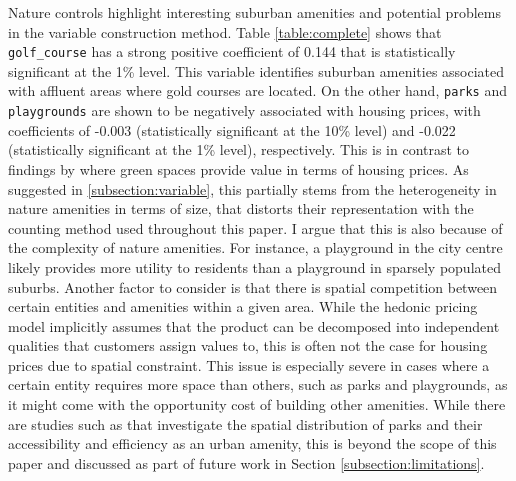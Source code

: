 \documentclass{article}
\begin{document}
Nature controls highlight interesting suburban amenities and potential problems in the variable construction method. Table \ref{table:complete} shows that \texttt{golf\_course} has a strong positive coefficient of 0.144 that is statistically significant at the 1\% level. This variable identifies suburban amenities associated with affluent areas where gold courses are located. On the other hand, \texttt{parks} and \texttt{playgrounds} are shown to be negatively associated with housing prices, with coefficients of -0.003 (statistically significant at the 10\% level) and -0.022 (statistically significant at the 1\% level), respectively. This is in contrast to findings by \citet{Gibbons2014TheApproach} where green spaces provide value in terms of housing prices. As suggested in \ref{subsection:variable}, this partially stems from the heterogeneity in nature amenities in terms of size, that distorts their representation with the counting method used throughout this paper. I argue that this is also because of the complexity of nature amenities. For instance, a playground in the city centre likely provides more utility to residents than a playground in sparsely populated suburbs. Another factor to consider is that there is spatial competition between certain entities and amenities within a given area. While the hedonic pricing model implicitly assumes that the product can be decomposed into independent qualities that customers assign values to, this is often not the case for housing prices due to spatial constraint. This issue is especially severe in cases where a certain entity requires more space than others, such as parks and playgrounds, as it might come with the opportunity cost of building other amenities. While there are studies such as \citet{Niu2018DetailedWuhan} that investigate the spatial distribution of parks and their accessibility and efficiency as an urban amenity, this is beyond the scope of this paper and discussed as part of future work in Section \ref{subsection:limitations}.\\\\
\end{document}
